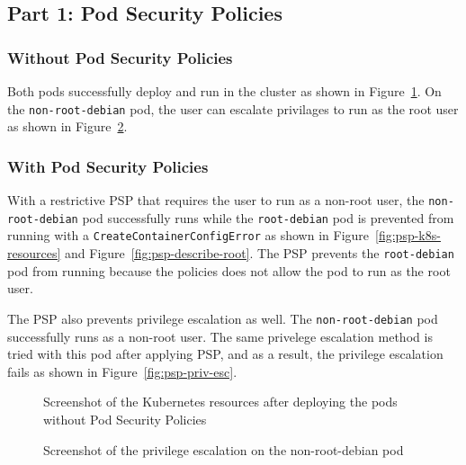 
\subsection{Part 1: Pod Security Policies}
\subsubsection{Without Pod Security Policies}
Both pods successfully deploy and run in the cluster as shown in Figure~\ref{fig:no-psp-k8s-resources}. On the 
\verb|non-root-debian| pod, the user can escalate privilages to run as the root user as shown in Figure~\ref{fig:no-psp-priv-esc}. 

\subsubsection{With Pod Security Policies}
With a restrictive PSP that requires the user to run as a non-root user, the \verb|non-root-debian| 
pod successfully runs while the \verb|root-debian| pod is prevented from running with a 
\verb|CreateContainerConfigError| as shown in Figure~\ref{fig:psp-k8s-resources} and 
Figure~\ref{fig:psp-describe-root}. The PSP prevents the \verb|root-debian| pod from running because
the policies does not allow the pod to run as the root user.

The PSP also prevents privilege escalation as well. The \verb|non-root-debian| pod successfully runs
as a non-root user. The same privelege escalation method is tried with this pod after applying PSP,
and as a result, the privilege escalation fails as shown in Figure~\ref{fig:psp-priv-esc}.

\onecolumn

\begin{figure}[t]
  \begin{center}
    \vspace{-0.2in}
    \caption{Screenshot of the Kubernetes resources after deploying the pods without Pod Security Policies}
    \label{fig:no-psp-k8s-resources}
  \end{center}
\end{figure}

\begin{figure}[t]
  \begin{center}
    \vspace{-0.2in}
    \caption{Screenshot of the privilege escalation on the non-root-debian pod}
    \label{fig:no-psp-priv-esc}
  \end{center}
\end{figure}

